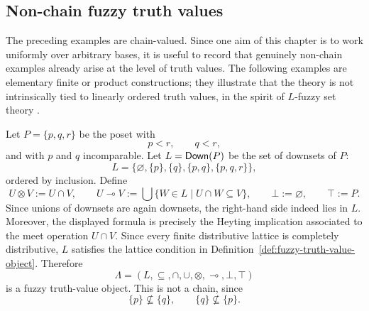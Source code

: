 \subsection{Non-chain fuzzy truth values}
\label{subsec:non-chain-fuzzy-truth-values}

The preceding examples are chain-valued. Since one aim of this chapter is to work uniformly over arbitrary bases, it is useful to record that genuinely non-chain examples already arise at the level of truth values. The following examples are elementary finite or product constructions; they illustrate that the theory is not intrinsically tied to linearly ordered truth values, in the spirit of \(L\)-fuzzy set theory \cite{Goguen1967LFuzzySets}.

\begin{example}
\label{ex:finite-nonchain-truth-value-algebra}
    Let \(P=\{p,q,r\}\) be the poset with
    \[
        p<r,
        \qquad
        q<r,
    \]
    and with \(p\) and \(q\) incomparable. Let \(L=\mathsf{Down}(P)\) be the set of downsets of \(P\):
    \[
        L=\bigl\{\varnothing,\{p\},\{q\},\{p,q\},\{p,q,r\}\bigr\},
    \]
    ordered by inclusion. Define
    \[
        U\otimes V:=U\cap V,
        \qquad
        U\multimap V:=\bigcup\{W\in L\mid U\cap W\subseteq V\},
        \qquad
        \bot:=\varnothing,
        \qquad
        \top:=P.
    \]
    Since unions of downsets are again downsets, the right-hand side indeed lies in \(L\). Moreover, the displayed formula is precisely the Heyting implication associated to the meet operation \(U\cap V\). Since every finite distributive lattice is completely distributive, \(L\) satisfies the lattice condition in Definition~\ref{def:fuzzy-truth-value-object}. Therefore
    \[
        \Lambda=(L,\subseteq,\cap,\cup,\otimes,\multimap,\bot,\top)
    \]
    is a fuzzy truth-value object. This is not a chain, since
    \[
        \{p\}\not\subseteq \{q\},
        \qquad
        \{q\}\not\subseteq \{p\}.
    \]
\end{example}

